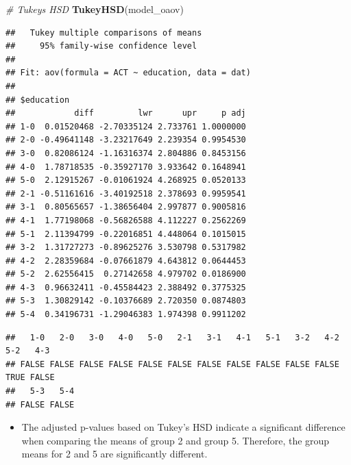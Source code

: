 \documentclass[
]{book}
\newenvironment{Shaded}{\begin{snugshade}}{\end{snugshade}}
\newcommand{\CommentTok}[1]{\textcolor[rgb]{0.56,0.35,0.01}{\textit{#1}}}
\newcommand{\DecValTok}[1]{\textcolor[rgb]{0.00,0.00,0.81}{#1}}
\newcommand{\FloatTok}[1]{\textcolor[rgb]{0.00,0.00,0.81}{#1}}
\newcommand{\FunctionTok}[1]{\textcolor[rgb]{0.13,0.29,0.53}{\textbf{#1}}}
\newcommand{\NormalTok}[1]{#1}
\newcommand{\SpecialCharTok}[1]{\textcolor[rgb]{0.81,0.36,0.00}{\textbf{#1}}}
\providecommand{\tightlist}{%
  \setlength{\itemsep}{0pt}\setlength{\parskip}{0pt}}
\begin{document}
\begin{Shaded}
\begin{Highlighting}[]
\CommentTok{\# Tukey\textquotesingle{}s HSD}
\FunctionTok{TukeyHSD}\NormalTok{(model\_oaov)}
\end{Highlighting}
\end{Shaded}

\begin{verbatim}
##   Tukey multiple comparisons of means
##     95% family-wise confidence level
## 
## Fit: aov(formula = ACT ~ education, data = dat)
## 
## $education
##            diff         lwr      upr     p adj
## 1-0  0.01520468 -2.70335124 2.733761 1.0000000
## 2-0 -0.49641148 -3.23217649 2.239354 0.9954530
## 3-0  0.82086124 -1.16316374 2.804886 0.8453156
## 4-0  1.78718535 -0.35927170 3.933642 0.1648941
## 5-0  2.12915267 -0.01061924 4.268925 0.0520133
## 2-1 -0.51161616 -3.40192518 2.378693 0.9959541
## 3-1  0.80565657 -1.38656404 2.997877 0.9005816
## 4-1  1.77198068 -0.56826588 4.112227 0.2562269
## 5-1  2.11394799 -0.22016851 4.448064 0.1015015
## 3-2  1.31727273 -0.89625276 3.530798 0.5317982
## 4-2  2.28359684 -0.07661879 4.643812 0.0644453
## 5-2  2.62556415  0.27142658 4.979702 0.0186900
## 4-3  0.96632411 -0.45584423 2.388492 0.3775325
## 5-3  1.30829142 -0.10376689 2.720350 0.0874803
## 5-4  0.34196731 -1.29046383 1.974398 0.9911202
\end{verbatim}

\begin{Shaded}
\end{Shaded}

\begin{verbatim}
##   1-0   2-0   3-0   4-0   5-0   2-1   3-1   4-1   5-1   3-2   4-2   5-2   4-3 
## FALSE FALSE FALSE FALSE FALSE FALSE FALSE FALSE FALSE FALSE FALSE  TRUE FALSE 
##   5-3   5-4 
## FALSE FALSE
\end{verbatim}

\begin{itemize}
\tightlist
\item
  The adjusted p-values based on Tukey's HSD indicate a significant difference when comparing the means of group 2 and group 5. Therefore, the group means for 2 and 5 are significantly different.
\end{itemize}
\end{document}
